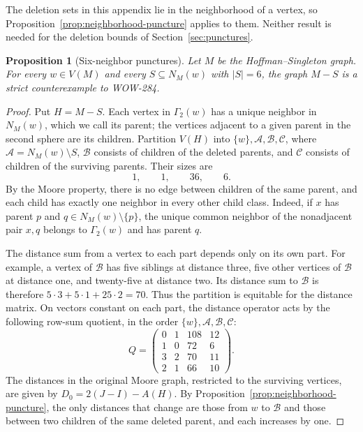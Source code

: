 \documentclass[a4paper,10pt,reqno]{amsart}
\theoremstyle{plain}
\newtheorem{proposition}[theorem]{Proposition}
\theoremstyle{definition}
\theoremstyle{remark}
\begin{document}
The deletion sets in this appendix lie in the neighborhood of a vertex, so
Proposition~\ref{prop:neighborhood-puncture} applies to them. Neither result
is needed for the deletion bounds of Section~\ref{sec:punctures}.

\begin{proposition}[Six-neighbor punctures]
\label{prop:hs-neighborhood-six}
Let \(M\) be the Hoffman--Singleton graph.  For every \(w\in V(M)\) and
every \(S\subseteq N_M(w)\) with \(|S|=6\), the graph \(M-S\) is a
strict counterexample to WOW-284.
\end{proposition}

\begin{proof}
Put \(H=M-S\). Each vertex in \(\Gamma_2(w)\) has a unique
neighbor in \(N_M(w)\), which we call its parent; the vertices adjacent to
a given parent in the second sphere are its children.  Partition \(V(H)\)
into \(\{w\},\mathcal A,\mathcal B,\mathcal C\), where
\(\mathcal A=N_M(w)\setminus S\), \(\mathcal B\) consists of children of
the deleted parents, and \(\mathcal C\) consists of children of the
surviving parents.  Their sizes are
\[
 1,\qquad1,\qquad36,\qquad6.
\]
By the Moore property, there is no edge between children of the same
parent, and each child has exactly one neighbor in every other child class.  Indeed, if \(x\) has
parent \(p\) and \(q\in N_M(w)\setminus\{p\}\), the unique common
neighbor of the nonadjacent pair \(x,q\) belongs to \(\Gamma_2(w)\)
and has parent \(q\).

The distance sum from a vertex to each part depends only on its own part.
For example, a vertex of \(\mathcal B\) has five siblings at distance three,
five other vertices of \(\mathcal B\) at distance one, and twenty-five at
distance two. Its distance sum to \(\mathcal B\) is therefore
\(5\cdot3+5\cdot1+25\cdot2=70\).
Thus the partition is equitable for the
distance matrix. On vectors constant on each part, the distance operator
acts by the following row-sum quotient, in the order
\(\{w\},\mathcal A,\mathcal B,\mathcal C\):
\[
 Q=\begin{pmatrix}
 0&1&108&12\\
 1&0&72&6\\
 3&2&70&11\\
 2&1&66&10
 \end{pmatrix}.
\]
The distances in the original Moore graph, restricted to the surviving vertices, are given by
\(D_0=2(J-I)-A(H)\).  By Proposition~\ref{prop:neighborhood-puncture}, the
only distances that change are those from \(w\) to \(\mathcal B\) and those
between two children of the same deleted parent, and each increases by one.


\end{proof}
\end{document}
